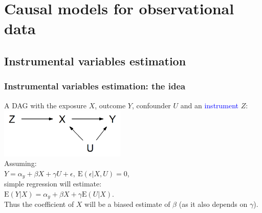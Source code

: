 \documentclass[10pt,dvipsnames,t,handout%
,aspectratio=169%
]{beamer}%
\newcommand{\E}{\mathrm{E}}
\begin{document}
\section{Causal models for observational data}
\subsection{Instrumental variables estimation}

\begin{frame}
 \frametitle{Instrumental variables estimation: the idea}
A DAG with the exposure $X$, outcome $Y$, confounder $U$ and an \textcolor{blue}{instrument} $Z$:\\[0.2cm]
\includegraphics[width=6cm]{IV} \\[0.2cm]
Assuming: \\
$Y= \alpha_y + \beta X + \gamma U +\epsilon,  \  \E(\epsilon|X,U)=0$, \\[0.2cm]
simple regression will estimate: \\[0.2cm]
$\E(Y|X)= \alpha_y + \beta X + \gamma \E(U|X)$. \\[0.3cm]
\alert{Thus the coefficient of $X$ will be a biased estimate of $\beta$ (as it also depends on $\gamma$). }
\end{frame}
\end{document}
